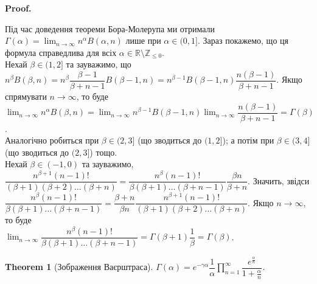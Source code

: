 \documentclass[a4paper, 10pt]{article}
\makeatletter
\def\huge{\displaystyle}
\theoremstyle{theoremdd}
\newtheorem{theorem}{Theorem}[subsection]
\theoremstyle{theoremdd}
\theoremstyle{theoremdd}
\theoremstyle{theoremdd}
\theoremstyle{theoremdd}
\theoremstyle{theoremdd}
\theoremstyle{theoremdd}
\theoremstyle{theoremdd}
\theoremstyle{theoremdd}
\renewenvironment{proof}[1][Proof.\\]{\par
\pushQED{\hfill \qed}%
\normalfont \topsep6\p@\@plus6\p@\relax
\trivlist
\item\relax
{\bfseries
#1\@addpunct{.}}\hspace\labelsep\ignorespaces
}{%
\popQED\endtrivlist\@endpefalse
}
\makeatother
\begin{document}
\begin{proof}
Під час доведення теореми Бора-Молерупа ми отримали $\Gamma(\alpha) = \displaystyle\lim_{n \to \infty} n^\alpha B(\alpha,n)$ лише при $\alpha \in (0,1]$. Зараз покажемо, що ця формула справедлива для всіх $\alpha \in \mathbb{R} \setminus \mathbb{Z}_{\leq 0}$.\\
Нехай $\beta \in (1,2]$ та зауважимо, що $n^\beta B(\beta,n) = n^\beta \dfrac{\beta-1}{\beta+n-1} B(\beta-1,n) = n^{\beta-1} B(\beta-1,n) \dfrac{n(\beta-1)}{\beta+n-1}$. Якщо спрямувати $n \to \infty$, то буде $\displaystyle\lim_{n \to \infty} n^\alpha B(\beta,n) = \lim_{n \to \infty} n^{\beta-1} B(\beta-1,n) \lim_{n \to \infty} \dfrac{n(\beta-1)}{\beta+n-1} = \Gamma(\beta)$.\\
Аналогічно робиться при $\beta \in (2,3]$ (що зводиться до $(1,2]$); а потім при $\beta \in (3,4]$ (що зводиться до $(2,3]$) тощо.\\
Нехай $\beta \in (-1,0)$ та зауважимо, $\dfrac{n^{\beta+1} (n-1)!}{(\beta+1) (\beta+2) \dots (\beta+n)} = \dfrac{n^\beta (n-1)!}{\beta (\beta+1) \dots (\beta+n-1)} \dfrac{\beta n}{\beta+n}$. Значить, звідси $\dfrac{n^\beta (n-1)!}{\beta (\beta+1) \dots (\beta+n-1)} = \dfrac{\beta+n}{\beta n} \dfrac{n^{\beta+1} (n-1)!}{(\beta+1) (\beta+2) \dots (\beta+n)}$. Якщо $n \to \infty$, то буде \\
$\displaystyle\lim_{n \to \infty} \dfrac{n^\beta (n-1)!}{\beta (\beta+1) \dots (\beta+n-1)} = \Gamma(\beta+1) \dfrac{1}{\beta} = \Gamma(\beta)$.
\end{proof}

\begin{theorem}[Зображення Ваєрштраса]
$\Gamma(\alpha) = e^{-\gamma \alpha} \dfrac{1}{\alpha} \displaystyle\prod_{n=1}^\infty \dfrac{e^{\frac{\alpha}{n}}}{1+\frac{\alpha}{n}}$.
\end{theorem}
\end{document}
